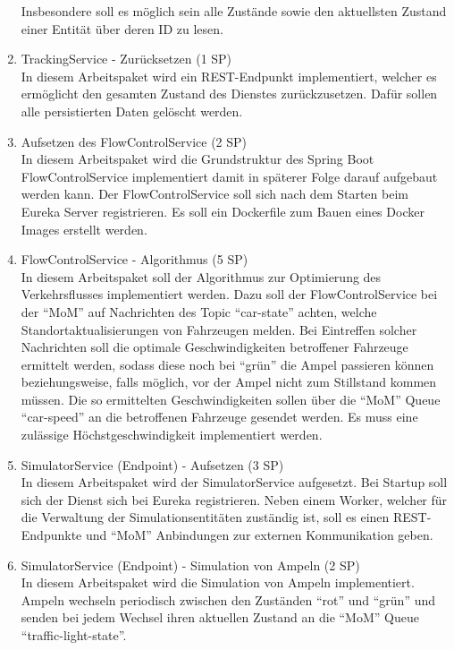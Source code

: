 \begin{enumerate}
  		Insbesondere soll es möglich sein alle Zustände sowie den aktuellsten Zustand einer Entität über deren ID zu lesen.
  \item TrackingService - Zurücksetzen (1 SP)\\
 		In diesem Arbeitspaket wird ein REST-Endpunkt implementiert, welcher es ermöglicht den gesamten Zustand des Dienstes zurückzusetzen.
 		Dafür sollen alle persistierten Daten gelöscht werden.
  \item Aufsetzen des FlowControlService (2 SP)\\
  		In diesem Arbeitspaket wird die Grundstruktur des Spring Boot FlowControlService implementiert damit in späterer Folge darauf aufgebaut werden kann.
  		Der FlowControlService soll sich nach dem Starten beim Eureka Server registrieren.
  		Es soll ein Dockerfile zum Bauen eines Docker Images erstellt werden.
  \item FlowControlService - Algorithmus (5 SP)\\
  		In diesem Arbeitspaket soll der Algorithmus zur Optimierung des Verkehrsflusses implementiert werden.
  		Dazu soll der FlowControlService bei der \enquote{MoM} auf Nachrichten des Topic \enquote{car-state} achten, welche Standortaktualisierungen von Fahrzeugen melden.
  		Bei Eintreffen solcher Nachrichten soll die optimale Geschwindigkeiten betroffener Fahrzeuge ermittelt werden, sodass diese noch bei \enquote{grün} die Ampel passieren können beziehungsweise, falls möglich, vor der Ampel nicht zum Stillstand kommen müssen.
  		Die so ermittelten Geschwindigkeiten sollen über die \enquote{MoM} Queue \enquote{car-speed} an die betroffenen Fahrzeuge gesendet werden.
  		Es muss eine zulässige Höchstgeschwindigkeit implementiert werden.
  \item SimulatorService (Endpoint) - Aufsetzen (3 SP)\\
  		In diesem Arbeitspaket wird der SimulatorService aufgesetzt.
  		Bei Startup soll sich der Dienst sich bei Eureka registrieren.
  		Neben einem Worker, welcher für die Verwaltung der Simulationsentitäten zuständig ist, soll es einen REST-Endpunkte und \enquote{MoM} Anbindungen zur externen Kommunikation geben.
  \item SimulatorService (Endpoint) - Simulation von Ampeln (2 SP)\\
  		In diesem Arbeitspaket wird die Simulation von Ampeln implementiert.
  		Ampeln wechseln periodisch zwischen den Zuständen \enquote{rot} und \enquote{grün} und senden bei jedem Wechsel ihren aktuellen Zustand an die \enquote{MoM} Queue \enquote{traffic-light-state}.

\end{enumerate}
